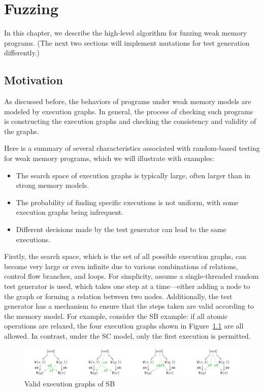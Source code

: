 \chapter{\label{cha:fuzz}Fuzzing}

In this chapter, we describe the high-level algorithm for fuzzing weak memory programs. (The next two sections will implement mutations for test generation differently.)

\section{Motivation}

As discussed before, the behaviors of programs under weak memory models are modeled by execution graphs. In general, the process of checking such programs is constructing the execution graphs and checking the consistency and validity of the graphs. 


Here is a summary of several characteristics associated with random-based testing for weak memory programs, which we will illustrate with examples:
\begin{itemize}
    \item The search space of execution graphs is typically large, often larger than in strong memory models.
    \item The probability of finding specific executions is not uniform, with some execution graphs being infrequent.
    \item Different decisions made by the test generator can lead to the same executions.
\end{itemize}





Firstly, the search space, which is the set of all possible execution graphs, can become very large or even infinite due to various combinations of relations, control flow branches, and loops. For simplicity, assume a single-threaded random test generator is used, which takes one step at a time—either adding a node to the graph or forming a relation between two nodes. Additionally, the test generator has a mechanism to ensure that the steps taken are valid according to the memory model. For example, consider the SB example: if all atomic operations are relaxed, the four execution graphs shown in Figure~\ref{SB4} are all allowed. In contrast, under the SC model, only the first execution is permitted.



\begin{figure}[h!tbp] %
    \centering
    \includegraphics[scale=0.65]{figure/exec-graph/SB4.pdf} %
    \caption{Valid execution graphs of SB} %
    \label{SB4} %
\end{figure}




